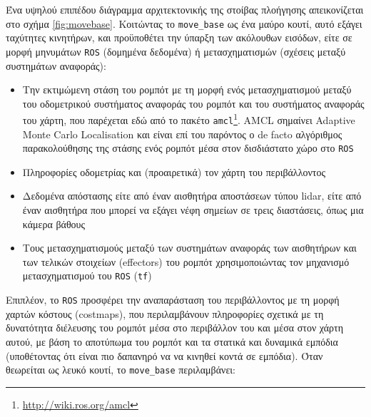 Ένα υψηλού επιπέδου διάγραμμα αρχιτεκτονικής της στοίβας πλοήγησης
απεικονίζεται στο σχήμα \ref{fig:movebase}. Κοιτώντας το \texttt{move\_base} ως
ένα μαύρο κουτί, αυτό εξάγει ταχύτητες κινητήρων, και προϋποθέτει την ύπαρξη
των ακόλουθων εισόδων, είτε σε μορφή μηνυμάτων \texttt{ROS} (δομημένα δεδομένα)
ή μετασχηματισμών (σχέσεις μεταξύ συστημάτων αναφοράς):

\begin{itemize}
  \item Την εκτιμώμενη στάση του ρομπότ με τη μορφή ενός μετασχηματισμού μεταξύ
        του οδομετρικού συστήματος αναφοράς του ρομπότ και του συστήματος
        αναφοράς του χάρτη, που παρέχεται εδώ από το πακέτο
        \texttt{amcl}\footnote{\url{http://wiki.ros.org/amcl}}.
        AMCL σημαίνει Adaptive Monte Carlo Localisation
        \cite{Fox2001,Grisetti2007} και είναι επί του παρόντος ο de facto
        αλγόριθμος παρακολούθησης της στάσης ενός ρομπότ μέσα στον δισδιάστατο
        χώρο στο \texttt{ROS}
  \item Πληροφορίες οδομετρίας και (προαιρετικά) τον χάρτη του περιβάλλοντος
  \item Δεδομένα απόστασης είτε από έναν αισθητήρα αποστάσεων τύπου lidar, είτε
        από έναν αισθητήρα που μπορεί να εξάγει νέφη σημείων σε τρεις
        διαστάσεις, όπως μια κάμερα βάθους
  \item Τους μετασχηματισμούς μεταξύ των συστημάτων αναφοράς
        των αισθητήρων και των τελικών στοιχείων (effectors) του ρομπότ
        χρησιμοποιώντας τον μηχανισμό μετασχηματισμού του \texttt{ROS}
        (\texttt{tf})
\end{itemize}

Επιπλέον, το \texttt{ROS} προσφέρει την αναπαράσταση του περιβάλλοντος με τη
μορφή χαρτών κόστους (costmaps), που περιλαμβάνουν πληροφορίες σχετικά με τη
δυνατότητα διέλευσης του ρομπότ μέσα στο περιβάλλον του και μέσα στον χάρτη
αυτού, με βάση το αποτύπωμα του ρομπότ και τα στατικά και δυναμικά εμπόδια
(υποθέτοντας ότι είναι πιο δαπανηρό να να κινηθεί κοντά σε εμπόδια). Όταν
θεωρείται ως λευκό κουτί, το \texttt{move\_base} περιλαμβάνει:

